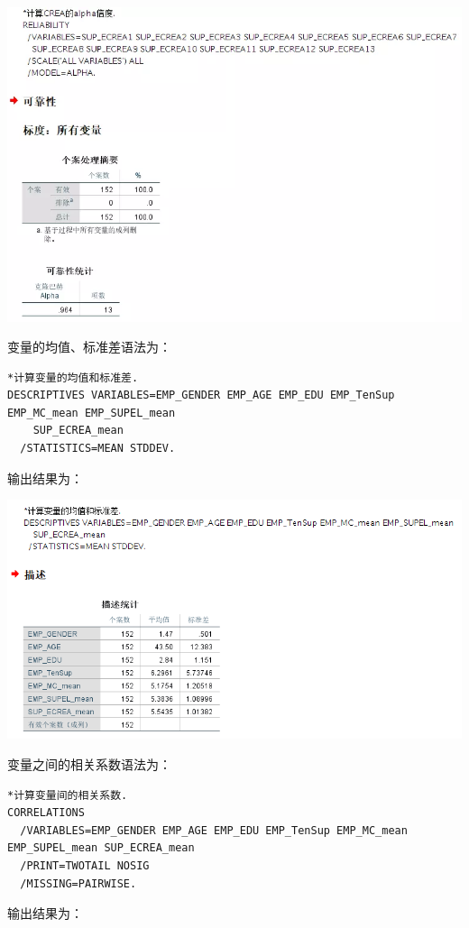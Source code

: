 \documentclass[
]{book}
\begin{document}
\includegraphics{figs/1314.png}

变量的均值、标准差语法为：

\begin{verbatim}
*计算变量的均值和标准差.
DESCRIPTIVES VARIABLES=EMP_GENDER EMP_AGE EMP_EDU EMP_TenSup EMP_MC_mean EMP_SUPEL_mean 
    SUP_ECREA_mean
  /STATISTICS=MEAN STDDEV.
\end{verbatim}

输出结果为：

\includegraphics{figs/1315.png}

变量之间的相关系数语法为：

\begin{verbatim}
*计算变量间的相关系数.
CORRELATIONS
  /VARIABLES=EMP_GENDER EMP_AGE EMP_EDU EMP_TenSup EMP_MC_mean EMP_SUPEL_mean SUP_ECREA_mean
  /PRINT=TWOTAIL NOSIG
  /MISSING=PAIRWISE.
\end{verbatim}

输出结果为：
\end{document}
